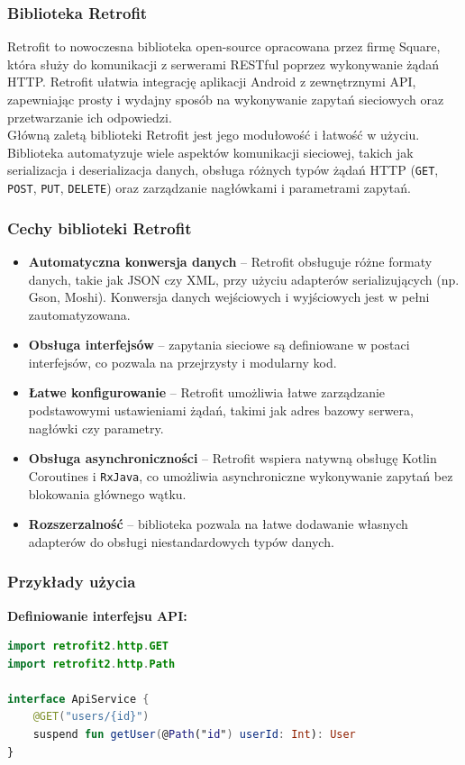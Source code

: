 \documentclass[12pt]{article}
\begin{document}
\subsubsection{Biblioteka Retrofit}
Retrofit to nowoczesna biblioteka open-source opracowana przez firmę Square, która służy do komunikacji z serwerami RESTful poprzez wykonywanie żądań HTTP.
Retrofit ułatwia integrację aplikacji Android z zewnętrznymi API, zapewniając prosty i wydajny sposób na wykonywanie zapytań sieciowych oraz przetwarzanie ich odpowiedzi.\\
Główną zaletą biblioteki Retrofit jest jego modułowość i łatwość w użyciu. Biblioteka automatyzuje wiele aspektów komunikacji sieciowej, takich jak serializacja
i deserializacja danych, obsługa różnych typów żądań HTTP (\texttt{GET}, \texttt{POST}, \texttt{PUT}, \texttt{DELETE}) oraz zarządzanie nagłówkami i parametrami zapytań.\cite{retrofit}

\subsubsection*{Cechy biblioteki Retrofit}
\begin{itemize}
    \item \textbf{Automatyczna konwersja danych} – Retrofit obsługuje różne formaty danych, takie jak JSON czy XML, przy użyciu adapterów serializujących (np. Gson, Moshi). Konwersja danych wejściowych i wyjściowych jest w pełni zautomatyzowana.
    \item \textbf{Obsługa interfejsów} – zapytania sieciowe są definiowane w postaci interfejsów, co pozwala na przejrzysty i modularny kod.
    \item \textbf{Łatwe konfigurowanie} – Retrofit umożliwia łatwe zarządzanie podstawowymi ustawieniami żądań, takimi jak adres bazowy serwera, nagłówki czy parametry.
    \item \textbf{Obsługa asynchroniczności} – Retrofit wspiera natywną obsługę Kotlin Coroutines i \texttt{RxJava}, co umożliwia asynchroniczne wykonywanie zapytań bez blokowania głównego wątku.
    \item \textbf{Rozszerzalność} – biblioteka pozwala na łatwe dodawanie własnych adapterów do obsługi niestandardowych typów danych.
\end{itemize}

\subsubsection*{Przykłady użycia}
\textbf{Definiowanie interfejsu API:}
\begin{lstlisting}[language=Kotlin]
import retrofit2.http.GET
import retrofit2.http.Path

interface ApiService {
	@GET("users/{id}")
	suspend fun getUser(@Path("id") userId: Int): User
}
\end{lstlisting}
\end{document}
